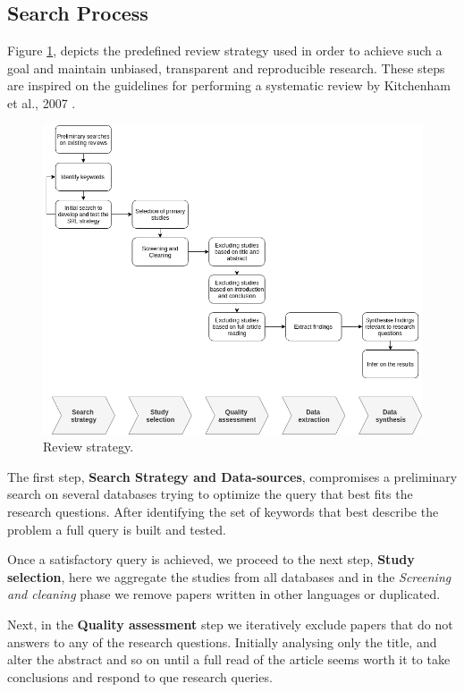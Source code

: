 \documentclass[final,3p,12pt,twocolumn]{elsarticle}
\begin{document}
\subsection{Search Process}\label{search-process}
Figure \ref{fig:/figures/SLR_stages}, depicts the predefined review strategy used in order to achieve such a goal and maintain unbiased, transparent and reproducible research. These steps are inspired on the guidelines for performing a systematic review by Kitchenham et al., 2007 \citet{Kitchenham2007}.

\begin{figure}[h]
  \begin{center}
    \leavevmode
    \includegraphics[width=\textwidth]{figures/SLR_stages.png}
    \caption{Review strategy.}
    \label{fig:/figures/SLR_stages}
  \end{center}
\end{figure}

The first step, \textbf{Search Strategy and Data-sources}, compromises a preliminary search on several databases trying to optimize the query that best fits the research questions. After identifying the set of keywords that best describe the problem a full query is built and tested.

Once a satisfactory query is achieved, we proceed to the next step, \textbf{Study selection}, here we aggregate the studies from all databases and in the \textit{Screening and cleaning} phase we remove papers written in other languages or duplicated.

Next, in the \textbf{Quality assessment} step we iteratively exclude papers that do not answers to any of the research questions. Initially analysing only the title, and alter the abstract and so on until a full read of the article seems worth it to take conclusions and respond to que research queries.
\end{document}
